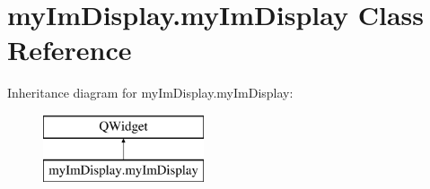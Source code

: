\hypertarget{classmy_im_display_1_1my_im_display}{\section{my\-Im\-Display.\-my\-Im\-Display Class Reference}
\label{classmy_im_display_1_1my_im_display}
}
Inheritance diagram for my\-Im\-Display.\-my\-Im\-Display\-:\begin{figure}[H]
\begin{center}
\leavevmode
\includegraphics[height=2.000000cm]{classmy_im_display_1_1my_im_display}
\end{center}
\end{figure}
